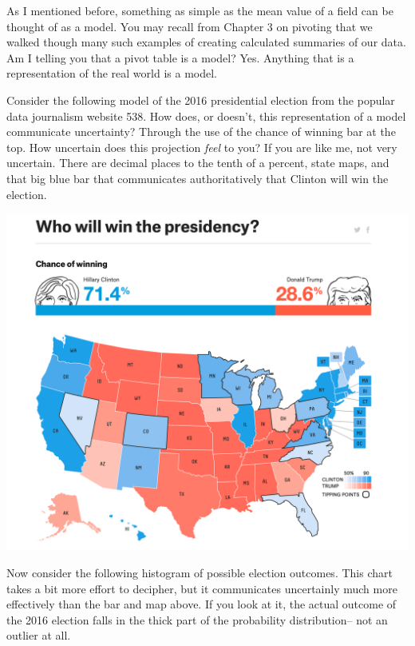 \documentclass[
]{book}
\begin{document}
As I mentioned before, something as simple as the mean value of a field can be thought of as a model. You may recall from Chapter 3 on pivoting that we walked though many such examples of creating calculated summaries of our data. Am I telling you that a pivot table is a model? Yes. Anything that is a representation of the real world is a model.

Consider the following model of the 2016 presidential election from the popular data journalism website 538. How does, or doesn't, this representation of a model communicate uncertainty? Through the use of the chance of winning bar at the top. How uncertain does this projection \emph{feel} to you? If you are like me, not very uncertain. There are decimal places to the tenth of a percent, state maps, and that big blue bar that communicates authoritatively that Clinton will win the election.

\includegraphics{images/map.png}

Now consider the following histogram of possible election outcomes. This chart takes a bit more effort to decipher, but it communicates uncertainly much more effectively than the bar and map above. If you look at it, the actual outcome of the 2016 election falls in the thick part of the probability distribution-- not an outlier at all.
\end{document}
